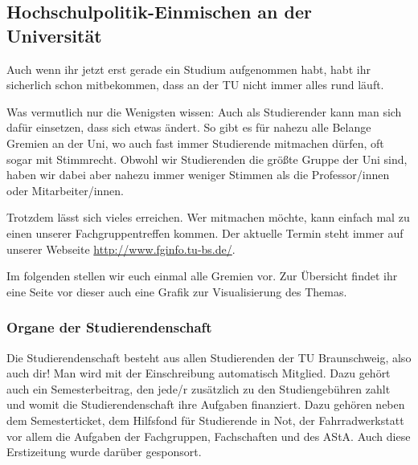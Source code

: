 \subsection{Hochschulpolitik-Einmischen an der Universität}

Auch wenn ihr jetzt erst gerade ein Studium aufgenommen habt, habt ihr sicherlich 
schon mitbekommen, dass an der TU nicht immer alles rund läuft.

Was vermutlich nur die Wenigsten wissen: Auch als Studierender kann man sich 
dafür einsetzen, dass sich etwas ändert. So gibt es für nahezu alle Belange Gremien 
an der Uni, wo auch fast immer Studierende mitmachen dürfen, oft sogar mit Stimmrecht. 
Obwohl wir Studierenden die größte Gruppe der Uni sind, haben wir dabei aber nahezu immer 
weniger Stimmen als die Professor/innen oder Mitarbeiter/innen. 

Trotzdem lässt sich vieles erreichen. Wer mitmachen möchte, kann einfach 
mal zu einen unserer Fachgruppentreffen kommen. Der aktuelle Termin steht immer 
auf unserer Webseite \url{http://www.fginfo.tu-bs.de/}.

Im folgenden stellen wir euch einmal alle Gremien vor. Zur Übersicht findet ihr eine Seite vor dieser auch eine Grafik 
zur Visualisierung des Themas.

\subsubsection*{Organe der Studierendenschaft}

Die Studierendenschaft besteht aus allen Studierenden der TU Braunschweig, also auch dir!
Man wird mit der Einschreibung automatisch Mitglied. Dazu gehört auch ein Semesterbeitrag, den jede/r 
zusätzlich zu den Studiengebühren zahlt und womit die Studierendenschaft ihre Aufgaben finanziert. 
Dazu gehören neben dem Semesterticket, dem Hilfsfond für Studierende in Not, der 
Fahrradwerkstatt vor allem die Aufgaben der Fachgruppen, Fachschaften und des AStA. Auch diese
Erstizeitung wurde darüber gesponsort.


